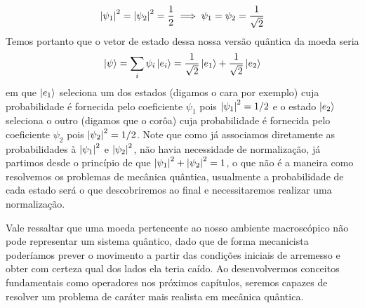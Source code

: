 \begin{example}{}
    \begin{equation*}
        \abs{\psi_1}^2 = \abs{\psi_2}^2 = \frac{1}{2} \implies \psi_1 = \psi_2 = \frac{1}{\sqrt{2}}
    \end{equation*}
    Temos portanto que o vetor de estado dessa nossa versão quântica da moeda seria
    \begin{equation*}
        \ket{\psi} = \sum_i \psi_i \ket{e_i} = \frac{1}{\sqrt{2}}\ket{e_1} + \frac{1}{\sqrt{2}}\ket{e_2}
    \end{equation*}
    em que $\ket{e_1}$ seleciona um dos estados (digamos o cara por exemplo) cuja probabilidade é fornecida pelo coeficiente $\psi_1$ pois $\abs{\psi_1}^2 = 1/2$ e o estado $\ket{e_2}$ seleciona o outro (digamos que o corôa) cuja probabilidade é fornecida pelo coeficiente $\psi_2$ pois $\abs{\psi_2}^2 = 1/2$. Note que como já associamos diretamente as probabilidades à $\abs{\psi_1}^2$ e $\abs{\psi_2}^2$, não havia necessidade de normalização, já partimos desde o princípio de que $\abs{\psi_1}^2 + \abs{\psi_2}^2 = 1$, o que não é a maneira como resolvemos os problemas de mecânica quântica, usualmente a probabilidade de cada estado será o que descobriremos ao final e necessitaremos realizar uma normalização.
    
    Vale ressaltar que uma moeda pertencente ao nosso ambiente macroscópico não pode representar um sistema quântico, dado que de forma mecanicista poderíamos prever o movimento a partir das condições iniciais de arremesso e obter com certeza qual dos lados ela teria caído. Ao desenvolvermos conceitos fundamentais como operadores nos próximos capítulos, seremos capazes de resolver um problema de caráter mais realista em mecânica quântica.
\end{example}